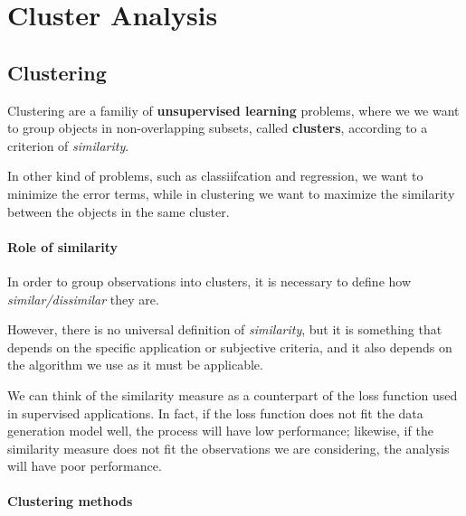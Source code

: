 \chapter{Cluster Analysis}
\section{Clustering}
Clustering are a familiy of \textbf{unsupervised learning} problems, where we we want to group objects in non-overlapping subsets, called \textbf{clusters}, according to a criterion of \textit{similarity}.

In other kind of problems, such as classiifcation and regression, we want to minimize the error terms, while in clustering we want to maximize the similarity between the objects in the same cluster.


\subsubsection*{Role of similarity}
In order to group observations into clusters, it is necessary to define how \textit{similar/dissimilar} they are.

However, there is no universal definition of \textit{similarity}, but it is something that depends on the specific application or subjective criteria, and it also depends on the algorithm we use as it must be applicable.

We can think of the similarity measure as a counterpart of the loss function used in supervised applications.
In fact, if the loss function does not fit the data generation model well, the process will have low performance; likewise, if the similarity measure does not fit the observations we are considering, the analysis will have poor performance.

\subsubsection*{Clustering methods}

